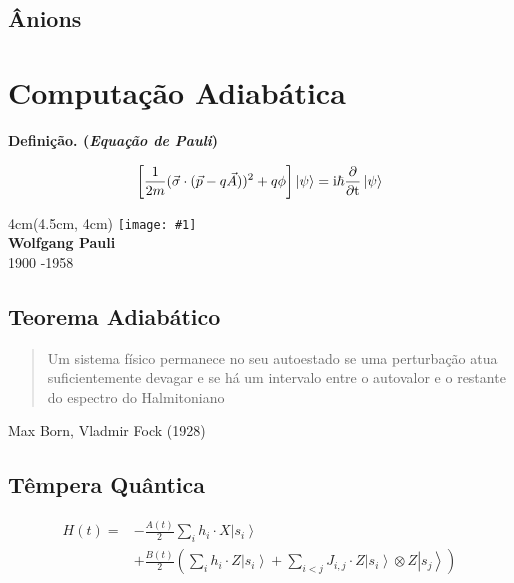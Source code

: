 \documentclass[t]{beamer}
\newcommand{\ii}{
	\rm{i}
}
\newcommand{\definicao}[1]{%
	\textbf{Definição. (\emph{#1})\\}
}
\newcommand{\ket}[1]{\ensuremath{\left|#1\right\rangle}}
\newcommand{\frasepor}[2]{
	\begin{center}
		\begin{quote}
			#1
		\end{quote}
		\hfill {\small #2}
	\end{center}
}
\newcommand{\person}[6]{%
\begin{textblock*}{#4}(#5, #6)
	\texttt{[image: \#1]}\\
	\textbf{#2}\\
	{\small #3}
\end{textblock*}
}
\begin{document}
	\begin{frame}{\subsecname}
	
	\end{frame}	
	
	\begin{frame}{\subsecname}
	
	\end{frame}
	
	\subsection{Ânions}
	
	\begin{frame}{\subsecname}
	
	\end{frame}	
	
	\begin{frame}{\subsecname}
	
	\end{frame}
	
	\section{Computação Adiabática}
	
	\begin{frame}{\secname}
	\definicao{Equação de Pauli}
	$$\left[{\frac {1}{2m}}({\vec {\sigma }}\cdot ({\vec {p}}-q{\vec {A}}))^{2}+q\phi \right]\ket{\psi} = \ii\hbar {\frac {\partial }{\partial t}}\ket{\psi}$$
	
	\person{pauli.jpg}{Wolfgang Pauli}{1900 -1958}{4cm}{4.5cm}{4cm}	
	
	\end{frame}
	
	\subsection{Teorema Adiabático}
	\begin{frame}{\subsecname}
	\frasepor{Um sistema físico permanece no seu autoestado se uma perturbação atua suficientemente devagar e se há um intervalo entre o autovalor e o restante do espectro do Halmitoniano}{Max Born, Vladmir Fock (1928)}
	\end{frame}
	
	
	\subsection{Têmpera Quântica}	
	
	\begin{frame}{\subsecname}
		\begin{align*}
			H(t) = &-\frac{A(t)}{2}  \sum_{i} h_i \cdot X\ket{s_i}\\ &+ \frac{B(t)}{2}\left(\sum_{i} h_i \cdot Z\ket{s_i} + \sum_{i < j} J_{i,j} \cdot Z\ket{s_i} \otimes Z\ket{s_j}\right)
		\end{align*}
	\end{frame}
	
\end{document}
